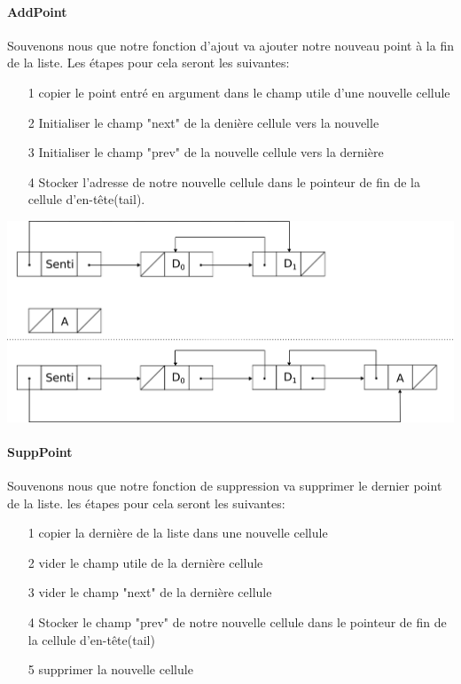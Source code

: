 \documentclass[a4paper, 11pt, oneside]{article}
\begin{document}
\paragraph{AddPoint}
\smallskip

Souvenons nous que notre fonction d'ajout va ajouter notre nouveau point à la fin de la liste. Les étapes pour cela seront les suivantes:
\begin{itemize}
    \item[1] copier le point entré en argument dans le champ utile d'une nouvelle cellule
    \item[2] Initialiser le champ "next" de la denière cellule vers la nouvelle
    \item[3] Initialiser le champ "prev" de la nouvelle cellule vers la dernière
    \item[4] Stocker l'adresse de notre nouvelle cellule dans le pointeur de fin de la cellule d'en-tête(tail).
\end{itemize}

\includegraphics[scale=0.8]{Add.png}


\paragraph{SuppPoint}
\smallskip

Souvenons nous que notre fonction de suppression va supprimer le dernier point de la liste. les étapes pour cela seront les suivantes:
\begin{itemize}
    \item[1] copier la dernière de la liste dans une nouvelle cellule
    \item[2] vider le champ utile de la dernière cellule
    \item[3] vider le champ "next" de la dernière cellule
    \item[4] Stocker le champ "prev" de notre nouvelle cellule dans le pointeur de fin de la cellule d'en-tête(tail)
    \item[5] supprimer la nouvelle cellule
\end{itemize}
\end{document}

